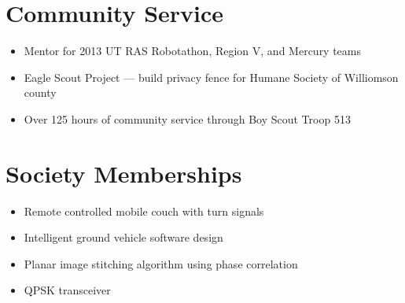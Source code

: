 \documentclass[a4paper,10pt]{article}
\begin{document}
\section{Community Service}
\begin{itemize}
  \item
    Mentor for 2013 UT RAS Robotathon, Region V, and Mercury teams
  \item
    Eagle Scout Project --- build privacy fence for Humane Society of Williomson county
  \item
    Over 125 hours of community service through Boy Scout Troop 513
\end{itemize}

\section{Society Memberships}
\begin{itemize} 
  \item
    Remote controlled mobile couch with turn signals
  \item
    Intelligent ground vehicle software design
  \item
    Planar image stitching algorithm using phase correlation
  \item
    QPSK transceiver
\end{itemize}
\end{document}
